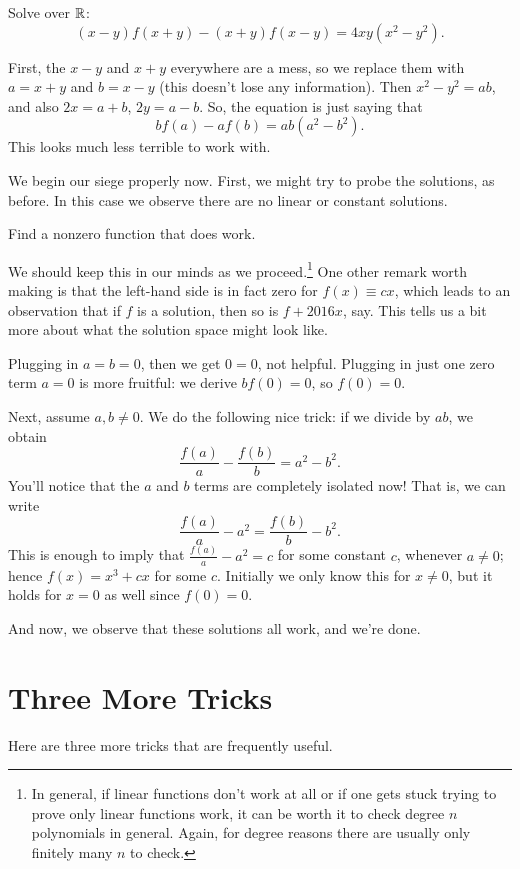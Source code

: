 \documentclass[11pt]{scrartcl}
\begin{document}
\begin{example}[Singapore 1999]
  \label{ex:singapore}
  Solve over $\mathbb R$:
  \[ (x-y)f(x+y) - (x+y)f(x-y) = 4xy(x^2-y^2). \]
\end{example}
\begin{soln}
  First, the $x-y$ and $x+y$ everywhere are a mess,
  so we replace them with $a = x+y$ and $b = x-y$ (this doesn't lose any information).
  Then $x^2-y^2 = ab$, and also $2x = a+b$, $2y = a-b$.
  So, the equation is just saying that
  \[ bf(a) - af(b) = ab(a^2-b^2). \]
  This looks much less terrible to work with.

  We begin our siege properly now.
  First, we might try to probe the solutions, as before.
  In this case we observe there are no linear or constant solutions.
  \begin{exercise}
    Find a nonzero function that does work.
  \end{exercise}
  We should keep this in our minds as we proceed.\footnote{%
    In general, if linear functions don't work at all
    or if one gets stuck trying to prove only linear functions work,
    it can be worth it to check degree $n$ polynomials in general.
    Again, for degree reasons there are usually only finitely many $n$ to check.}
  One other remark worth making is that the left-hand side is in fact zero
  for $f(x) \equiv cx$, which leads to an observation that
  if $f$ is a solution, then so is $f+2016x$, say.
  This tells us a bit more about what the solution space might look like.

  Plugging in $a=b=0$, then we get $0=0$, not helpful.
  Plugging in just one zero term $a=0$ is more fruitful: we derive
  $bf(0) = 0$, so $f(0) = 0$.

  Next, assume $a,b \neq 0$.
  We do the following nice trick:
  if we divide by $ab$, we obtain
  \[ \frac{f(a)}{a} - \frac{f(b)}{b} = a^2 - b^2. \]
  You'll notice that the $a$ and $b$ terms are completely isolated now!
  That is, we can write
  \[ \frac{f(a)}{a} - a^2 = \frac{f(b)}{b} - b^2. \]
  This is enough to imply that $\frac{f(a)}{a} - a^2 = c$ for some constant $c$,
  whenever $a \neq 0$; hence $f(x) = x^3 + cx$ for some $c$.
  Initially we only know this for $x \neq 0$,
  but it holds for $x=0$ as well since $f(0) = 0$.

  And now, we observe that these solutions all work, and we're done.
\end{soln}

\section{Three More Tricks}
Here are three more tricks that are frequently useful.
\end{document}

